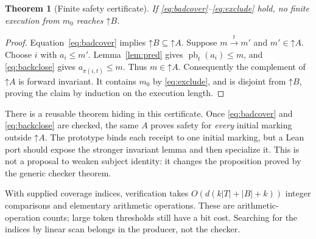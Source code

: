 \documentclass[11pt,a4paper]{article}
\newtheorem{theorem}{Theorem}[section]
\theoremstyle{definition}\newtheorem{definition}[theorem]{Definition}
\theoremstyle{remark}\newtheorem{remark}[theorem]{Remark}
\newcommand{\up}[1]{\mathord{\uparrow}#1}
\begin{document}
\begin{theorem}[Finite safety certificate]
\label{thm:safety}
If \eqref{eq:badcover}--\eqref{eq:exclude} hold, no finite execution from $m_0$ reaches $\up B$.
\end{theorem}
\begin{proof}
Equation~\eqref{eq:badcover} implies $\up B\subseteq\up A$. Suppose $m\xrightarrow{t}m'$ and $m'\in\up A$. Choose $i$ with $a_i\le m'$. Lemma~\ref{lem:pred} gives $\operatorname{pb}_t(a_i)\le m$, and \eqref{eq:backclose} gives $a_{\pi(i,t)}\le m$. Thus $m\in\up A$. Consequently the complement of $\up A$ is forward invariant. It contains $m_0$ by \eqref{eq:exclude}, and is disjoint from $\up B$, proving the claim by induction on the execution length.
\end{proof}

There is a reusable theorem hiding in this certificate. Once \eqref{eq:badcover} and \eqref{eq:backclose} are checked, the same $A$ proves safety for \emph{every} initial marking outside $\up A$. The prototype binds each receipt to one initial marking, but a Lean port should expose the stronger invariant lemma and then specialize it. This is not a proposal to weaken subject identity: it changes the proposition proved by the generic checker theorem.

With supplied coverage indices, verification takes $O(d(k|T|+|B|+k))$ integer comparisons and elementary arithmetic operations. These are arithmetic-operation counts; large token thresholds still have a bit cost. Searching for the indices by linear scan belongs in the producer, not the checker.
\end{document}
